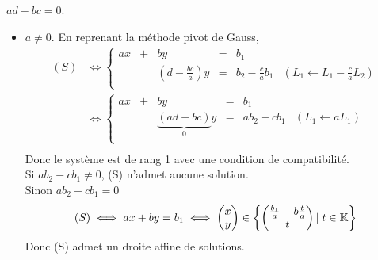 \documentclass{article}
\renewenvironment{question_kholle}[2][ ]
{
	\subsection{\texorpdfstring{#2}{}}
	\notblank{#1}
	{
		\noindent #1
		\bigbreak
	}
	{}
	\begin{proof}
}
{
	\end{proof}
}
\begin{document}
\begin{question_kholle}
  \item $ad - bc = 0$.
  \begin{itemize}[label=$\bullet$ Supposons]
    \item $a \neq 0$. En reprenant la méthode pivot de Gauss,
          \begin{equation*}
            \begin{aligned}
              (S)
               & \iff \left\{
              \begin{array}{cccccc}
                ax & + & by                             & = & b_1                                                            \\
                   &   & \left(d - \frac{bc}{a}\right)y & = & b_2 - \frac{c}{a} b_1 & (L_1 \leftarrow L_1 - \frac{c}{a} L_2) \\
              \end{array}
              \right.         \\
               & \iff \left\{
              \begin{array}{cccccc}
                ax & + & by                                    & = & b_1                                   \\
                   &   & \underbrace{\left(ad - bc\right)}_0 y & = & a b_2 - c b_1 & (L_1 \leftarrow aL_1) \\
              \end{array}
              \right.         \\
            \end{aligned}
          \end{equation*}
          Donc le système est de rang 1 avec une condition de compatibilité. \\
          Si $ab_2 - cb_1 \neq 0$, (S) n'admet aucune solution. \\
          Sinon $ab_2 - cb_1 = 0$
          \begin{equation}
            (S) \iff
            ax + by = b_1 \iff
            \begin{pmatrix} x \\ y \end{pmatrix} \in \left\{
            \begin{pmatrix} \frac{b_1}{a} - b\frac{t}{a} \\ t \end{pmatrix}
            |\; t \in \mathbb K
            \right\}
          \end{equation}
          Donc (S) admet un droite affine de solutions.


\end{itemize}
\end{question_kholle}
\end{document}
